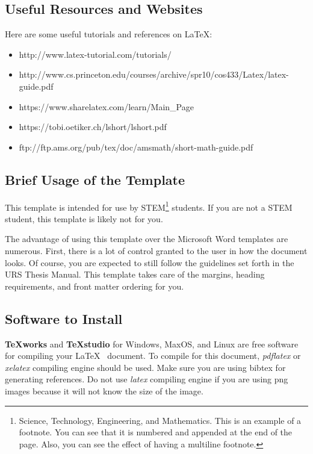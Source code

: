 \subsection{Useful Resources and Websites}

Here are some useful tutorials and references on \LaTeX:
\begin{itemize}
  \item http://www.latex-tutorial.com/tutorials/
  \item http://www.cs.princeton.edu/courses/archive/spr10/cos433/Latex/latex-guide.pdf
  \item https://www.sharelatex.com/learn/Main\_Page
  \item https://tobi.oetiker.ch/lshort/lshort.pdf
  \item ftp://ftp.ams.org/pub/tex/doc/amsmath/short-math-guide.pdf
\end{itemize}

\subsection{Brief Usage of the Template}

This template is intended for use by STEM\footnote{Science, Technology, Engineering, and Mathematics. This is an example of a footnote. You can see that it is numbered and appended at the end of the page. Also, you can see the effect of having a multiline footnote.} students. If you are not a STEM student, this template is likely not for you.

The advantage of using this template over the Microsoft Word templates are
numerous. First, there is a lot of control granted to the user in how the
document looks. Of course, you are expected to still follow the guidelines set
forth in the URS Thesis Manual. This template takes care of the margins, heading requirements, and front matter ordering for you.


\subsection{Software to Install}

\textbf{TeXworks} and \textbf{TeXstudio} for Windows, MaxOS, and Linux are free software for compiling
your \LaTeX ~ document. To compile for this document, \textit{pdflatex} or \textit{xelatex} compiling engine
should be used. Make sure you are using bibtex for generating references. Do not use \textit{latex} compiling
engine if you are using png images because it will not know the size of the image.

